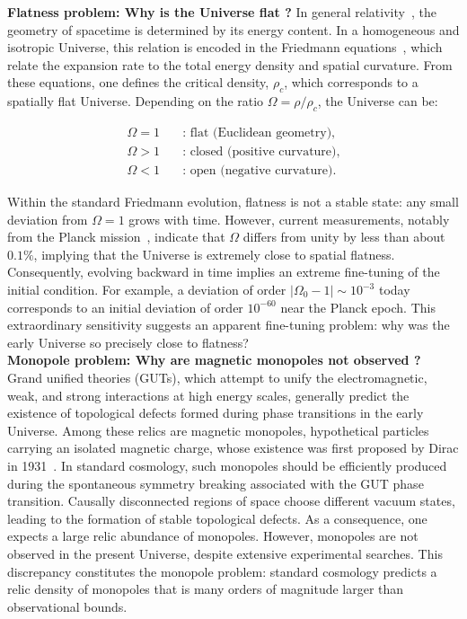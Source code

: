 \documentclass[../../thesis.tex]{subfiles}
\begin{document}
\textbf{Flatness problem: Why is the Universe flat ?} In general relativity~\cite{einstein1916_general_relativity}, the geometry of spacetime is determined by its energy content. In a homogeneous and isotropic Universe, this relation is encoded in the Friedmann equations~\cite{friedmann1922}, which relate the expansion rate to the total energy density and spatial curvature. From these equations, one defines the critical density, $\rho_c$, which corresponds to a spatially flat Universe. Depending on the ratio $\Omega = \rho / \rho_c$, the Universe can be:

\begin{align*}
    \Omega = 1 &\quad \text{: flat (Euclidean geometry)}, \\
    \Omega > 1 &\quad \text{: closed (positive curvature)}, \\
    \Omega < 1 &\quad \text{: open (negative curvature)}.
\end{align*}

Within the standard Friedmann evolution, flatness is not a stable state: any small deviation from $\Omega = 1$ grows with time. However, current measurements, notably from the Planck mission~\cite{planck2018VI}, indicate that $\Omega$ differs from unity by less than about $0.1\%$, implying that the Universe is extremely close to spatial flatness. Consequently, evolving backward in time implies an extreme fine-tuning of the initial condition. For example, a deviation of order $|\Omega_0 - 1| \sim 10^{-3}$ today corresponds to an initial deviation of order $10^{-60}$ near the Planck epoch. This extraordinary sensitivity suggests an apparent fine-tuning problem: why was the early Universe so precisely close to flatness? \\

\textbf{Monopole problem: Why are magnetic monopoles not observed ?} Grand unified theories (GUTs), which attempt to unify the electromagnetic, weak, and strong interactions at high energy scales, generally predict the existence of topological defects formed during phase transitions in the early Universe. Among these relics are magnetic monopoles, hypothetical particles carrying an isolated magnetic charge, whose existence was first proposed by Dirac in 1931~\cite{dirac1931}. In standard cosmology, such monopoles should be efficiently produced during the spontaneous symmetry breaking associated with the GUT phase transition. Causally disconnected regions of space choose different vacuum states, leading to the formation of stable topological defects. As a consequence, one expects a large relic abundance of monopoles. However, monopoles are not observed in the present Universe, despite extensive experimental searches. This discrepancy constitutes the monopole problem: standard cosmology predicts a relic density of monopoles that is many orders of magnitude larger than observational bounds.
\end{document}
